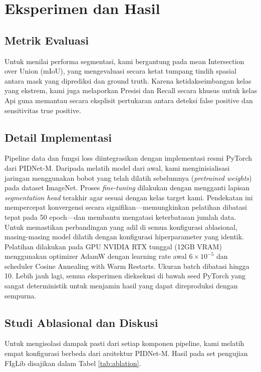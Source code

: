 \documentclass[conference]{IEEEtran}
\begin{document}
\section{Eksperimen dan Hasil}

\subsection{Metrik Evaluasi}
Untuk menilai performa segmentasi, kami bergantung pada mean Intersection over Union (mIoU), yang mengevaluasi secara ketat tumpang tindih spasial antara mask yang diprediksi dan ground truth. Karena ketidakseimbangan kelas yang ekstrem, kami juga melaporkan Presisi dan Recall secara khusus untuk kelas Api guna memantau secara eksplisit pertukaran antara deteksi false positive dan sensitivitas true positive.

\subsection{Detail Implementasi}
Pipeline data dan fungsi loss diintegrasikan dengan implementasi resmi PyTorch dari PIDNet-M. Daripada melatih model dari awal, kami menginisialisasi jaringan menggunakan bobot yang telah dilatih sebelumnya (\textit{pretrained weights}) pada dataset ImageNet. Proses \textit{fine-tuning} dilakukan dengan mengganti lapisan \textit{segmentation head} terakhir agar sesuai dengan kelas target kami. Pendekatan ini mempercepat konvergensi secara signifikan---memungkinkan pelatihan dibatasi tepat pada 50 epoch---dan membantu mengatasi keterbatasan jumlah data. Untuk memastikan perbandingan yang adil di semua konfigurasi ablasional, masing-masing model dilatih dengan konfigurasi hiperparameter yang identik. Pelatihan dilakukan pada GPU NVIDIA RTX tunggal (12GB VRAM) menggunakan optimizer AdamW dengan learning rate awal $6 \times 10^{-5}$ dan scheduler Cosine Annealing with Warm Restarts. Ukuran batch dibatasi hingga 10. Lebih jauh lagi, semua eksperimen dieksekusi di bawah seed PyTorch yang sangat deterministik untuk menjamin hasil yang dapat direproduksi dengan sempurna.

\subsection{Studi Ablasional dan Diskusi}
Untuk mengisolasi dampak pasti dari setiap komponen pipeline, kami melatih empat konfigurasi berbeda dari arsitektur PIDNet-M. Hasil pada set pengujian FIgLib disajikan dalam Tabel \ref{tab:ablation}.
\end{document}
